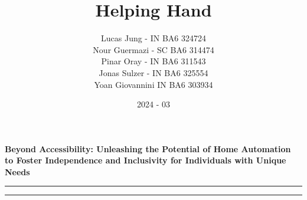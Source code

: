 \documentclass[12pt, a4paper, openany]{article}
\title{Helping Hand}
\author{Lucas Jung - IN BA6 324724\\Nour Guermazi - SC BA6 314474\\Pinar Oray - IN BA6 311543\\Jonas Sulzer - IN BA6 325554\\Yoan Giovannini IN BA6 303934}
\date{2024 - 03}
\begin{document}
\maketitle
\thispagestyle{fancy}

\begin{center}
    \textbf{Beyond Accessibility: Unleashing the Potential of Home Automation to Foster Independence and Inclusivity for Individuals with Unique Needs}
\end{center}

\par\noindent\rule{\textwidth}{0.4pt}
\vspace{-20pt}
\tableofcontents
\par\noindent\rule{\textwidth}{0.4pt}

\vspace{10pt}


\newpage

\newpage

\end{document}
